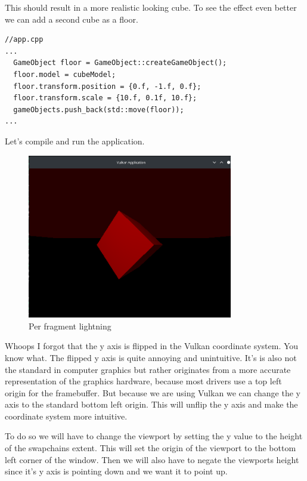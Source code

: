 \documentclass[12pt]{report} \usepackage{preamble}
\begin{document}
This should result in a more realistic looking cube.
To see the effect even better we can add a second cube as a floor.

\begin{lstlisting}[Language=C++]
//app.cpp
...
  GameObject floor = GameObject::createGameObject();
  floor.model = cubeModel;
  floor.transform.position = {0.f, -1.f, 0.f};
  floor.transform.scale = {10.f, 0.1f, 10.f};
  gameObjects.push_back(std::move(floor));
...
\end{lstlisting}

Let's compile and run the application.

\begin{figure}[htbp]
	\centering
	\includegraphics[width=0.8\textwidth]{images/floor_error.png}
	\caption{Per fragment lightning}
\end{figure} \FloatBarrier

Whoops I forgot that the y axis is flipped in the Vulkan coordinate system. You know what. The flipped y axis is quite annoying and unintuitive.
It's is also not the standard in computer graphics but rather originates from a more accurate representation of the graphics hardware, because
most drivers use a top left origin for the framebuffer. But because we are using Vulkan we can change the y axis to the standard bottom left origin.
This will unflip the y axis and make the coordinate system more intuitive.

To do so we will have to change the viewport by setting the y value to the height of the swapchains extent. This will set the origin of the viewport to the bottom left corner of the window.
Then we will also have to negate the viewports height since it's y axis is pointing down and we want it to point up.
\end{document}
